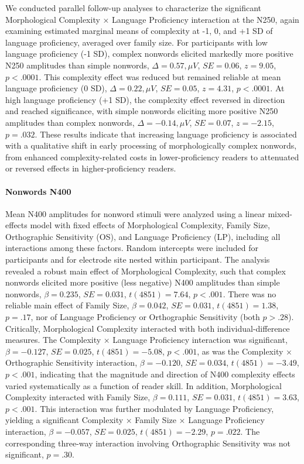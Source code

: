 \documentclass[utf8]{FrontiersinHarvard} %
\begin{document}
We conducted parallel follow-up analyses to characterize the significant Morphological Complexity × Language Proficiency interaction at the N250, again examining estimated marginal means of complexity at -1, 0, and +1 SD of language proficiency, averaged over family size. For participants with low language proficiency (-1 SD), complex nonwords elicited markedly more positive N250 amplitudes than simple nonwords, $\Delta = 0.57,\mu V$, $SE = 0.06$, $z = 9.05$, $p < .0001$. This complexity effect was reduced but remained reliable at mean language proficiency (0 SD), $\Delta = 0.22,\mu V$, $SE = 0.05$, $z = 4.31$, $p < .0001$. At high language proficiency (+1 SD), the complexity effect reversed in direction and reached significance, with simple nonwords eliciting more positive N250 amplitudes than complex nonwords, $\Delta = -0.14,\mu V$, $SE = 0.07$, $z = -2.15$, $p = .032$. These results indicate that increasing language proficiency is associated with a qualitative shift in early processing of morphologically complex nonwords, from enhanced complexity-related costs in lower-proficiency readers to attenuated or reversed effects in higher-proficiency readers.



\paragraph*{Nonwords N400}
Mean N400 amplitudes for nonword stimuli were analyzed using a linear mixed-effects model with fixed effects of Morphological Complexity, Family Size, Orthographic Sensitivity (OS), and Language Proficiency (LP), including all interactions among these factors. Random intercepts were included for participants and for electrode site nested within participant. The analysis revealed a robust main effect of Morphological Complexity, such that complex nonwords elicited more positive (less negative) N400 amplitudes than simple nonwords, $\beta = 0.235$, $SE = 0.031$, $t(4851) = 7.64$, $p < .001$. There was no reliable main effect of Family Size, $\beta = 0.042$, $SE = 0.031$, $t(4851) = 1.38$, $p = .17$, nor of Language Proficiency or Orthographic Sensitivity (both $p > .28$). Critically, Morphological Complexity interacted with both individual-difference measures. The Complexity × Language Proficiency interaction was significant, $\beta = -0.127$, $SE = 0.025$, $t(4851) = -5.08$, $p < .001$, as was the Complexity × Orthographic Sensitivity interaction, $\beta = -0.120$, $SE = 0.034$, $t(4851) = -3.49$, $p < .001$, indicating that the magnitude and direction of N400 complexity effects varied systematically as a function of reader skill. In addition, Morphological Complexity interacted with Family Size, $\beta = 0.111$, $SE = 0.031$, $t(4851) = 3.63$, $p < .001$. This interaction was further modulated by Language Proficiency, yielding a significant Complexity × Family Size × Language Proficiency interaction, $\beta = -0.057$, $SE = 0.025$, $t(4851) = -2.29$, $p = .022$. The corresponding three-way interaction involving Orthographic Sensitivity was not significant, $p = .30$.
\end{document}
